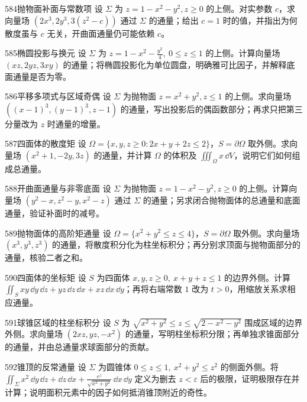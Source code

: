 \begin{exercise}{584}{抛物面补面与常数项}
设 $\Sigma$ 为 $z=1-x^2-y^2,z\ge0$ 的上侧。对实参数 $c$，求向量场 $(2x^3,2y^3,3(z^2-c))$ 通过 $\Sigma$ 的通量；给出 $c=1$ 时的值，并指出为何散度虽与 $c$ 无关，开曲面通量仍可能依赖 $c$。
\end{exercise}
\begin{exercise}{585}{椭圆投影与换元}
设 $\Sigma$ 为 $z=1-x^2-\frac{y^2}{4},\ 0\le z\le1$ 的上侧。计算向量场 $(xz,2yz,3xy)$ 的通量；将椭圆投影化为单位圆盘，明确雅可比因子，并解释底面通量是否为零。
\end{exercise}
\begin{exercise}{586}{平移多项式与区域奇偶}
设 $\Sigma$ 为抛物面 $z=x^2+y^2,z\le1$ 的上侧。求向量场 $((x-1)^3,(y-1)^3,z-1)$ 的通量，写出投影后的偶函数部分；再求只把第三分量改为 $z$ 时通量的增量。
\end{exercise}
\begin{exercise}{587}{四面体的散度矩}
设 $\Omega=\{x,y,z\ge0:2x+y+2z\le2\}$，$S=\partial\Omega$ 取外侧。求向量场 $(x^2+1,-2y,3z)$ 的通量，并计算 $\Omega$ 的体积及 $\iiint_{\Omega}x\,\dd V$，说明它们如何组成总通量。
\end{exercise}
\begin{exercise}{588}{开曲面通量与非零底面}
设 $\Sigma$ 为抛物面 $z=1-x^2-y^2,z\ge0$ 的上侧。计算向量场 $(y^2-x,z^2-y,x^2-z)$ 通过 $\Sigma$ 的通量；另求闭合抛物面体的总通量和底面通量，验证补面时的减号。
\end{exercise}
\begin{exercise}{589}{抛物面体的高阶矩通量}
设 $\Omega=\{x^2+y^2\le z\le4\}$，$S=\partial\Omega$ 取外侧。求向量场 $(x^3,y^3,z^3)$ 的通量，将散度积分化为柱坐标积分；再分别求顶面与抛物面部分的通量，核验二者之和。
\end{exercise}
\begin{exercise}{590}{四面体的坐标矩}
设 $S$ 为四面体 $x,y,z\ge0,\ x+y+z\le1$ 的边界外侧。计算 $\iint_Sxy\,\dd y\,\dd z+yz\,\dd z\,\dd x+xz\,\dd x\,\dd y$；再将右端常数 $1$ 改为 $t>0$，用缩放关系求相应通量。
\end{exercise}
\begin{exercise}{591}{球锥区域的柱坐标积分}
设 $S$ 为 $\sqrt{x^2+y^2}\le z\le\sqrt{2-x^2-y^2}$ 围成区域的边界外侧。求向量场 $(2xz,yz,-x^2)$ 的通量，写明柱坐标积分限；再单独求锥面部分的通量，并由总通量求球面部分的贡献。
\end{exercise}
\begin{exercise}{592}{锥顶的反常通量}
设 $\Sigma$ 为圆锥体 $0\le z\le1,\ x^2+y^2\le z^2$ 的侧面外侧。将 $\iint_{\Sigma}x^2\,\dd y\,\dd z+\dd z\,\dd x+\frac{e^z}{\sqrt{x^2+y^2}}\,\dd x\,\dd y$ 定义为删去 $z<\varepsilon$ 后的极限，证明极限存在并计算；说明面积元素中的因子如何抵消锥顶附近的奇性。
\end{exercise}
